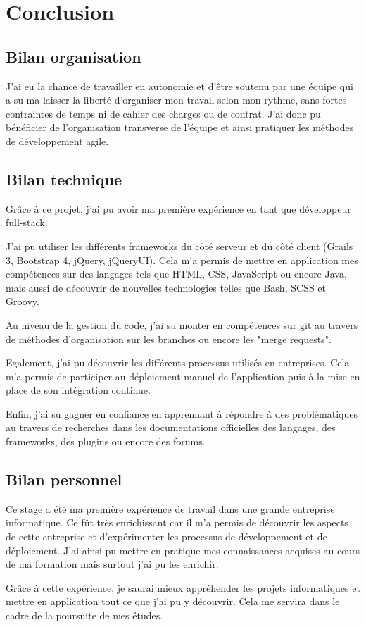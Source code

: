 \chapter{Conclusion}
\label{chap:Conclusion}

\section{Bilan organisation}
J'ai eu la chance de travailler en autonomie et d'être soutenu par une équipe qui a su ma laisser la liberté d'organiser mon travail selon mon rythme,
sans fortes contraintes de temps ni de cahier des charges ou de contrat. J'ai donc pu bénéficier de l'organisation transverse de l'équipe et
ainsi pratiquer les méthodes de développement agile.

\section{Bilan technique}
Grâce à ce projet, j'ai pu avoir ma première expérience en tant que développeur full-stack.

J'ai pu utiliser les différents frameworks du côté serveur et du côté client (Grails 3, Bootstrap 4, jQuery, jQueryUI).
Cela m'a permis de mettre en application mes compétences sur des langages tels que HTML, CSS, JavaScript ou encore Java, mais aussi de découvrir de nouvelles technologies
telles que Bash, SCSS et Groovy.

Au niveau de la gestion du code, j'ai su monter en compétences sur git au travers de méthodes d'organisation sur les branches ou encore les "merge requests".

Egalement, j'ai pu découvrir les différents processus utilisés en entreprises. Cela m'a permis de participer au déploiement manuel de l'application
puis à la mise en place de son intégration continue.

Enfin, j'ai su gagner en confiance en apprennant à répondre à des problématiques au travers de recherches dans les documentations officielles des langages, des frameworks, des plugins
ou encore des forums.

\section{Bilan personnel}
Ce stage a été ma première expérience de travail dans une grande entreprise informatique. Ce fût très enrichissant car il m’a permis de découvrir les aspects
de cette entreprise et d'expérimenter les processus de développement et de déploiement. J'ai ainsi pu mettre en pratique mes connaissances acquises au cours de
ma formation mais surtout j'ai pu les enrichir.

Grâce à cette expérience, je saurai mieux appréhender les projets informatiques et mettre en application tout ce que j'ai pu y découvrir.
Cela me servira dans le cadre de la poursuite de mes études. 
